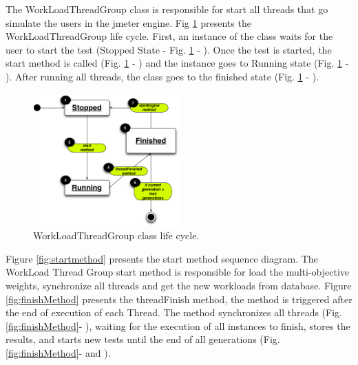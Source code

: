 \documentclass[espaco=umemeio,chapter=TITLE,twoside,openright]{abnt}
\begin{document}
The WorkLoadThreadGroup class is responsible for start all threads that go simulate the users in the jmeter engine. Fig \ref{fig:statesworkload} presents the WorkLoadThreadGroup life cycle. First, an instance of the class waits for the user to start the test (Stopped State - Fig. \ref{fig:statesworkload} - ). Once the test is started, the start method is called (Fig. \ref{fig:statesworkload} - ) and the instance goes to Running state (Fig. \ref{fig:statesworkload} - ). After running all threads, the class goes to the finished state  (Fig. \ref{fig:statesworkload} - ).


\begin{figure}[h]
\centering
\includegraphics[width=0.5\textwidth]{./images/statesworkload.png}
\caption{WorkLoadThreadGroup class life cycle.}
\label{fig:statesworkload}
\end{figure}



Figure \ref{fig:startmethod} presents the start method sequence diagram. The WorkLoad Thread Group start method is responsible for load the multi-objective weights, synchronize all threads and get the new workloads from database. Figure \ref{fig:finishMethod} presents the threadFinish method, the method is triggered after the end of execution of each Thread. The method synchronizes all threads (Fig. \ref{fig:finishMethod}- ), waiting for the execution of all instances to finish, stores the results, and starts new tests until the end of all generations (Fig. \ref{fig:finishMethod}- and  ).
\end{document}
